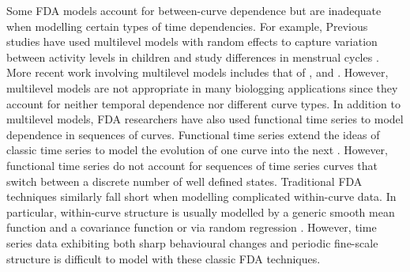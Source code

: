 Some FDA models account for between-curve dependence but are inadequate when modelling certain types of time dependencies. %
For example, 
Previous studies have used multilevel models with random effects to capture variation between activity levels in children \citep{Morris:2007} and study differences in menstrual cycles \citet{Bromback:1998}. More recent work involving multilevel models includes that of \citet{Di:2009}, \citet{Chen:2012} and \citet{Crainiceanu:2009}. However, multilevel models are not appropriate in many biologging applications since they account for neither temporal dependence nor different curve types. 
In addition to multilevel models, FDA researchers have also used functional time series to model dependence in sequences of curves. Functional time series extend the ideas of classic time series to model the evolution of one curve into the next \citep{Kokoszka:2018}. %
However, functional time series do not account for sequences of time series curves that switch between a discrete number of well defined states.
%
Traditional FDA techniques similarly fall short when modelling complicated within-curve %
data. In particular, within-curve structure is usually modelled by a generic smooth mean function and a covariance function \citep{Yao:2005} 
or via random regression \citep{Rice:2001}. 
However, time series data exhibiting both sharp behavioural changes and periodic fine-scale structure is difficult to model with these classic FDA techniques.


